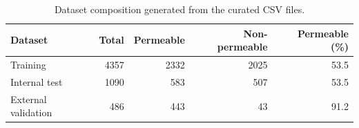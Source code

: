 \begin{table}[H]
\centering
\caption{Dataset composition generated from the curated CSV files.}
\label{tab:py_dataset_composition}
\begin{tabular}{lrrrr}
\toprule
Dataset & Total & Permeable & Non-permeable & Permeable (\%) \\
\midrule
Training & 4357 & 2332 & 2025 & 53.5 \\
Internal test & 1090 & 583 & 507 & 53.5 \\
External validation & 486 & 443 & 43 & 91.2 \\
\bottomrule
\end{tabular}
\end{table}
